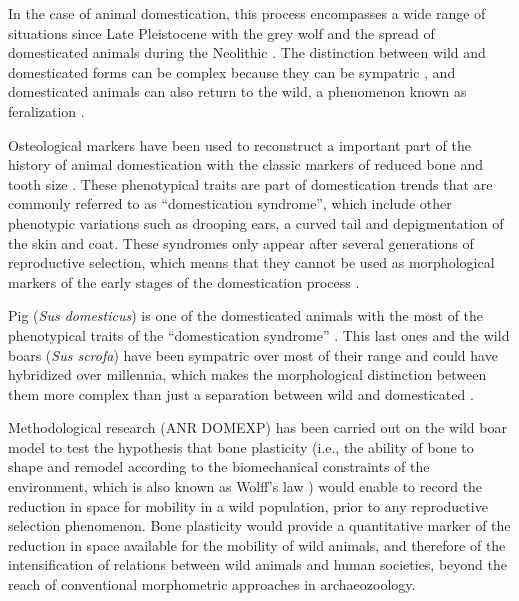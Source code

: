 \documentclass[12pt,a4paper]{article}
\begin{document}
In the case of animal domestication, this process encompasses a wide range of situations since Late Pleistocene with the grey wolf \cite{lahtinenExcessProteinEnabled2021d} and the spread of domesticated animals during the Neolithic \cite{orlandoAnimauxSauvagesAnimaux2021j,vigneEarlyDomesticationFarming2015d,zederPathwaysAnimalDomestication2012}. The distinction between wild and domesticated forms can be complex because they can be sympatric \cite{evinPhenotypeAnimalDomestication2015g}, and domesticated animals can also return to the wild, a phenomenon known as feralization \cite{rowley-conwyDistinguishingWildBoar2012p}.

Osteological markers have been used to reconstruct a important part of the history of animal domestication with the classic markers of reduced bone and tooth size \cite{payneComponentsVariationMeasurements1988d,priceArchaeologyPigDomestication2020r}. These phenotypical traits are part of domestication trends that are commonly referred to as ``domestication syndrome'', which include other phenotypic variations such as drooping ears, a curved tail and depigmentation of the skin and coat. These syndromes only appear after several generations of reproductive selection, which means that they cannot be used as morphological markers of the early stages of the domestication process \cite{belyaevDomesticationSilverFox1985d,cucchiAnimalDomesticationDistant2021,sanchez-villagraTamingNeuralCrest2016d}.

Pig (\textit{Sus domesticus}) is one of the domesticated animals with the most of the phenotypical traits of the ``domestication syndrome'' \cite{sanchez-villagraTamingNeuralCrest2016d}. This last ones and the wild boars (\textit{Sus scrofa}) have been sympatric over most of their range and could have hybridized over millennia, which makes the morphological distinction between them more complex than just a separation between wild and domesticated \cite{bogaardReconsideringDomesticationProcess2021v,grovesChapter51Eurasian1993d,longIntroducedMammalsWorld2003d}.

Methodological research (ANR DOMEXP) has been carried out on the wild boar model to test the hypothesis that bone plasticity (i.e., the ability of bone to shape and remodel according to the biomechanical constraints of the environment, which is also known as Wolff's law \cite{wolffLawBoneRemodelling1986,ruffWhosAfraidBig2006t}) would enable to record the reduction in space for mobility in a wild population, prior to any reproductive selection phenomenon. Bone plasticity would provide a quantitative marker of the reduction in space available for the mobility of wild animals, and therefore of the intensification of relations between wild animals and human societies, beyond the reach of conventional morphometric approaches in archaeozoology.
\end{document}
